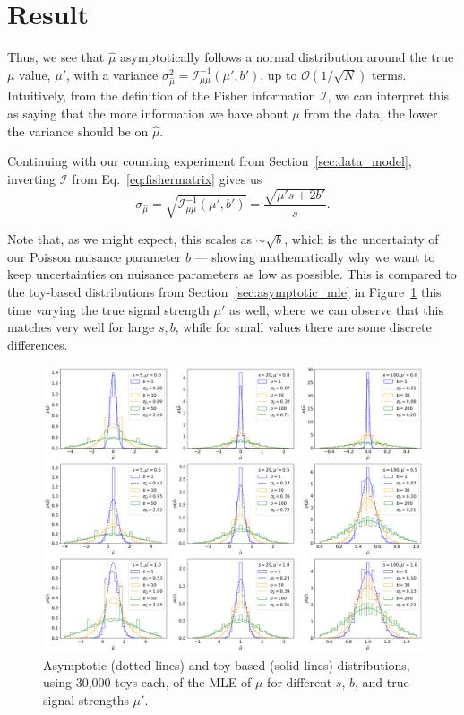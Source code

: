 \section{Result}
\label{sec:pmle_result}

Thus, we see that $\hat \mu$ asymptotically follows a normal distribution around the true $\mu$ value, $\mu'$, with a variance $\sigma_{\hat\mu}^2 = \mathcal I^{-1}_{\mu\mu}(\mu', b')$, up to $\mathcal O (1/\sqrt{N})$ terms.
Intuitively, from the definition of the Fisher information $\mathcal I$, we can interpret this as saying that the more information we have about $\mu$ from the data, the lower the variance should be on $\hat \mu$.

Continuing with our counting experiment from Section~\ref{sec:data_model}, inverting $\mathcal I$ from Eq.~\ref{eq:fishermatrix} gives us
\begin{equation}
    \sigma_{\hat\mu} = \sqrt{\mathcal I^{-1}_{\mu\mu}(\mu', b')} = \frac{\sqrt{\mu' s + 2b'}}{s}.
\label{eq:asymstd}
\end{equation}

Note that, as we might expect, this scales as $\sim \sqrt{b}$, which is the uncertainty of our Poisson nuisance parameter $b$ --- showing mathematically why we want to keep uncertainties on nuisance parameters as low as possible.
This is compared to the toy-based distributions from Section~\ref{sec:asymptotic_mle} in Figure~\ref{fig:p_mle_asym} this time varying the true signal strength $\mu'$ as well, where we can observe that this matches very well for large $s, b$, while for small values there are some discrete differences.

\begin{figure}[htb]
\centering
\includegraphics[width=\textwidth]{figures/05-asymptotic-mle/4.png}
\caption{Asymptotic (dotted lines) and toy-based (solid lines) distributions, using 30,000 toys each, of the MLE of $\mu$ for different $s$, $b$, and true signal strengths $\mu'$.}
\label{fig:p_mle_asym}
\end{figure}

